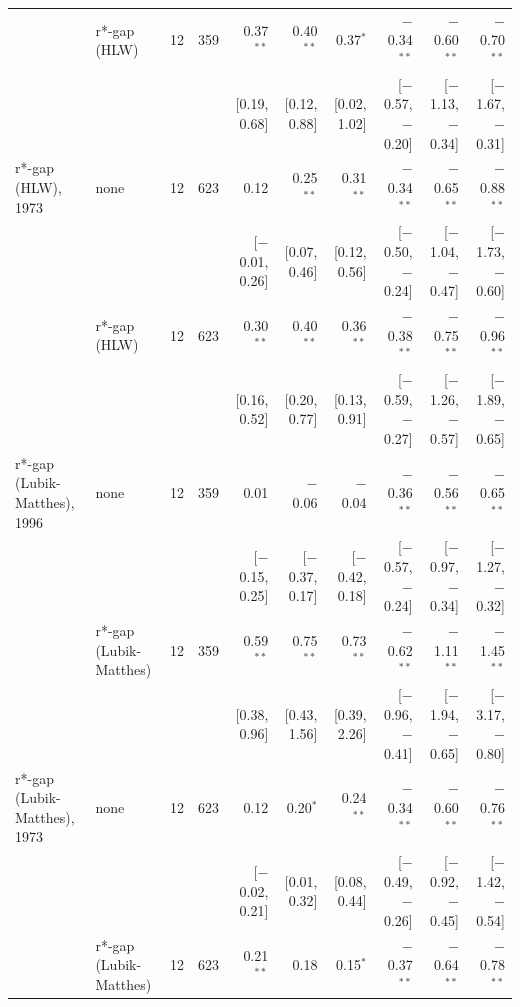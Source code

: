 \begin{table}[tp]
{\begin{tabular}{llcrrrrrrr}
 & r*-gap (HLW) & 12 & 359 & 0.37$^{**}$ & 0.40$^{**}$ & 0.37$^{*}$ & $-$0.34$^{**}$ & $-$0.60$^{**}$ & $-$0.70$^{**}$\\
 & & & & {\scriptsize [0.19, 0.68]} & {\scriptsize [0.12, 0.88]} & {\scriptsize [0.02, 1.02]} & {\scriptsize [$-$0.57, $-$0.20]} & {\scriptsize [$-$1.13, $-$0.34]} & {\scriptsize [$-$1.67, $-$0.31]}\\
\addlinespace
r*-gap (HLW), 1973 & none & 12 & 623 & 0.12 & 0.25$^{**}$ & 0.31$^{**}$ & $-$0.34$^{**}$ & $-$0.65$^{**}$ & $-$0.88$^{**}$\\
 & & & & {\scriptsize [$-$0.01, 0.26]} & {\scriptsize [0.07, 0.46]} & {\scriptsize [0.12, 0.56]} & {\scriptsize [$-$0.50, $-$0.24]} & {\scriptsize [$-$1.04, $-$0.47]} & {\scriptsize [$-$1.73, $-$0.60]}\\
 & r*-gap (HLW) & 12 & 623 & 0.30$^{**}$ & 0.40$^{**}$ & 0.36$^{**}$ & $-$0.38$^{**}$ & $-$0.75$^{**}$ & $-$0.96$^{**}$\\
 & & & & {\scriptsize [0.16, 0.52]} & {\scriptsize [0.20, 0.77]} & {\scriptsize [0.13, 0.91]} & {\scriptsize [$-$0.59, $-$0.27]} & {\scriptsize [$-$1.26, $-$0.57]} & {\scriptsize [$-$1.89, $-$0.65]}\\
\addlinespace
r*-gap (Lubik-Matthes), 1996 & none & 12 & 359 & 0.01 & $-$0.06 & $-$0.04 & $-$0.36$^{**}$ & $-$0.56$^{**}$ & $-$0.65$^{**}$\\
 & & & & {\scriptsize [$-$0.15, 0.25]} & {\scriptsize [$-$0.37, 0.17]} & {\scriptsize [$-$0.42, 0.18]} & {\scriptsize [$-$0.57, $-$0.24]} & {\scriptsize [$-$0.97, $-$0.34]} & {\scriptsize [$-$1.27, $-$0.32]}\\
 & r*-gap (Lubik-Matthes) & 12 & 359 & 0.59$^{**}$ & 0.75$^{**}$ & 0.73$^{**}$ & $-$0.62$^{**}$ & $-$1.11$^{**}$ & $-$1.45$^{**}$\\
 & & & & {\scriptsize [0.38, 0.96]} & {\scriptsize [0.43, 1.56]} & {\scriptsize [0.39, 2.26]} & {\scriptsize [$-$0.96, $-$0.41]} & {\scriptsize [$-$1.94, $-$0.65]} & {\scriptsize [$-$3.17, $-$0.80]}\\
\addlinespace
r*-gap (Lubik-Matthes), 1973 & none & 12 & 623 & 0.12 & 0.20$^{*}$ & 0.24$^{**}$ & $-$0.34$^{**}$ & $-$0.60$^{**}$ & $-$0.76$^{**}$\\
 & & & & {\scriptsize [$-$0.02, 0.21]} & {\scriptsize [0.01, 0.32]} & {\scriptsize [0.08, 0.44]} & {\scriptsize [$-$0.49, $-$0.26]} & {\scriptsize [$-$0.92, $-$0.45]} & {\scriptsize [$-$1.42, $-$0.54]}\\
 & r*-gap (Lubik-Matthes) & 12 & 623 & 0.21$^{**}$ & 0.18 & 0.15$^{*}$ & $-$0.37$^{**}$ & $-$0.64$^{**}$ & $-$0.78$^{**}$\\

\end{tabular}}
\end{table}
